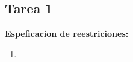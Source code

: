 \documentclass{report}
\begin{document}
	
	

    \newpage
	
	\begin{center}
		\section*{\LARGE{Tarea 1}}
	\end{center}

    \begin{center}
		\LARGE{\textbf{Espeficacion de reestriciones:}}\\
        \normalsize
	\end{center}
    \begin{enumerate}
        \item 
    \end{enumerate}

    
    
  
\end{document}
